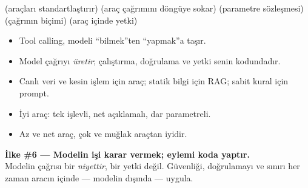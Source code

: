  (araçları standartlaştırır) \tlsep {} (araç çağrımını döngüye sokar) \tlsep
{} (parametre sözleşmesi) \tlsep {} (çağrının biçimi) \tlsep
{} (araç içinde yetki)

\begin{itemize}
  \item Tool calling, modeli ``bilmek''ten ``yapmak''a taşır.
  \item Model çağrıyı \emph{üretir}; çalıştırma, doğrulama ve yetki senin kodundadır.
  \item Canlı veri ve kesin işlem için araç; statik bilgi için RAG; sabit kural için prompt.
  \item İyi araç: tek işlevli, net açıklamalı, dar parametreli.
  \item Az ve net araç, çok ve muğlak araçtan iyidir.
\end{itemize}

\begin{principlebox}
\textbf{İlke \#6 — Modelin işi karar vermek; eylemi koda yaptır.}\\[4pt]
\normalsize Modelin çağrısı bir \emph{niyettir}, bir yetki değil. Güvenliği,
doğrulamayı ve sınırı her zaman aracın içinde --- modelin dışında --- uygula.
\end{principlebox}
